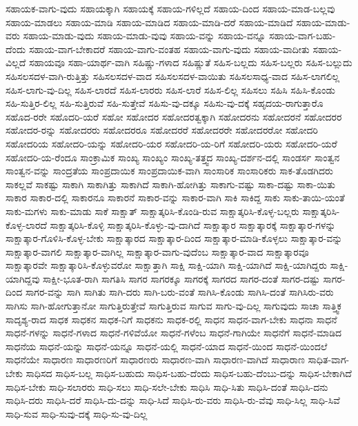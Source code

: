 {ಸಹಾಯಕ-ವಾಗು-ವುದು
ಸಹಾಯಕ್ಕಾಗಿ
ಸಹಾಯಕ್ಕೆ
ಸಹಾಯ-ಗಳಿಲ್ಲದೆ
ಸಹಾಯ-ದಿಂದ
ಸಹಾಯ-ಮಾಡ-ಬಲ್ಲವು
ಸಹಾಯ-ಮಾಡಲು
ಸಹಾಯ-ಮಾಡಿ
ಸಹಾಯ-ಮಾಡಿದ
ಸಹಾಯ-ಮಾಡಿ-ದರೆ
ಸಹಾಯ-ಮಾಡಿದೆ
ಸಹಾಯ-ಮಾಡು-ವರು
ಸಹಾಯ-ಮಾಡು-ವುದು
ಸಹಾಯ-ಮಾಡು-ವುವು
ಸಹಾಯ-ವನ್ನು
ಸಹಾಯ-ವನ್ನೂ
ಸಹಾಯ-ವಾಗ-ಬಹು-ದೆಂದು
ಸಹಾಯ-ವಾಗ-ಬೇಕಾದರೆ
ಸಹಾಯ-ವಾಗು-ವಂತಹ
ಸಹಾಯ-ವಾಗು-ವುದು
ಸಹಾಯ-ವಾದೀತು
ಸಹಾಯ-ವಿಲ್ಲದೆ
ಸಹಾಯವೂ
ಸಹಾ-ಯಾರ್ಥ-ವಾಗಿ
ಸಹಿಷ್ಣು-ಗಳಾದ
ಸಹಿಷ್ಣುತೆ
ಸಹಿಸ-ಬಲ್ಲದು
ಸಹಿಸ-ಬಲ್ಲರು
ಸಹಿಸ-ಬಲ್ಲುದು
ಸಹಿಸಲಸದಳ-ವಾಗಿ-ರುತ್ತಿತ್ತು
ಸಹಿಸಲಸದಳ-ವಾದ
ಸಹಿಸಲಸದಳ-ವಾಯಿತು
ಸಹಿಸಲಸಾಧ್ಯ-ವಾದ
ಸಹಿಸ-ಲಾಗಲಿಲ್ಲ
ಸಹಿಸ-ಲಾಗು-ವು-ದಿಲ್ಲ
ಸಹಿಸ-ಲಾರದೆ
ಸಹಿಸ-ಲಾರರು
ಸಹಿಸ-ಲಾರೆ
ಸಹಿಸ-ಲಿಲ್ಲ
ಸಹಿಸಲು
ಸಹಿಸಿ
ಸಹಿಸಿ-ಕೊಂಡು
ಸಹಿ-ಸುತ್ತಿರ-ಲಿಲ್ಲ
ಸಹಿ-ಸುತ್ತಿರುವೆ
ಸಹಿ-ಸುತ್ತೇವೆ
ಸಹಿಸು-ವು-ದಕ್ಕೂ
ಸಹಿಸು-ವು-ದಕ್ಕೆ
ಸಹೃದಯ-ರಾಗುತ್ತಾರೊ
ಸಹೊದ-ರರೇ
ಸಹೊದರಿ-ಯರೆ
ಸಹೋ
ಸಹೋದರ
ಸಹೋದರತ್ವಕ್ಕಾಗಿ
ಸಹೋದರನು
ಸಹೋದರನೆ
ಸಹೋದರರ
ಸಹೋದರ-ರನ್ನು
ಸಹೋದರರು
ಸಹೋದರರೂ
ಸಹೋದರರೆ
ಸಹೋದರರೇ
ಸಹೋದರರೋ
ಸಹೋದರಿ
ಸಹೋದರಿಯ
ಸಹೋದರಿ-ಯನ್ನು
ಸಹೋದರಿ-ಯರ
ಸಹೋದರಿ-ಯ-ರಿಗೆ
ಸಹೋದರಿ-ಯರು
ಸಹೋದರಿ-ಯರೆ
ಸಹೋದರಿ-ಯ-ರೆಂದೂ
ಸಾಂಕ್ರಾಮಿಕ
ಸಾಂಖ್ಯ
ಸಾಂಖ್ಯಂ
ಸಾಂಖ್ಯ-ತತ್ತ್ವದ
ಸಾಂಖ್ಯ-ದರ್ಶನ-ದಲ್ಲಿ
ಸಾಂಡರ್ಸ
ಸಾಂತ್ವನ
ಸಾಂತ್ವನ-ವನ್ನು
ಸಾಂದ್ರತೆಯ
ಸಾಂಪ್ರದಾಯಿಕ
ಸಾಂಪ್ರದಾಯಿಕ-ವಾಗಿ
ಸಾಂಸಾರಿಕ
ಸಾಂಸಾರಿಕರು
ಸಾಕ-ತೊಡಗಿದರು
ಸಾಕಲ್ಲವೆ
ಸಾಕಷ್ಟು
ಸಾಕಾಗಿ
ಸಾಕಾಗಿತ್ತು
ಸಾಕಾಗಿದೆ
ಸಾಕಾಗಿ-ಹೋಗಿತ್ತು
ಸಾಕಾಗು-ವಷ್ಟು
ಸಾಕಾ-ದಷ್ಟು
ಸಾಕಾ-ಯಿತು
ಸಾಕಾರ
ಸಾಕಾರ-ದಲ್ಲಿ
ಸಾಕಾರನೂ
ಸಾಕಾರನೆ
ಸಾಕಾರ-ವನ್ನು
ಸಾಕಾರ-ವಾಗಿ
ಸಾಕಿ
ಸಾಕಿದ್ದ
ಸಾಕು
ಸಾಕು-ತಾಯಿ-ಯಂತೆ
ಸಾಕು-ಮಗಳು
ಸಾಕು-ಮಾಡು
ಸಾಕೆ
ಸಾಕ್ಷಾತ್
ಸಾಕ್ಷಾತ್ಕರಿಸಿ-ಕೊಂಡಿ-ರುವ
ಸಾಕ್ಷಾತ್ಕರಿಸಿ-ಕೊಳ್ಳ-ಬಲ್ಲರು
ಸಾಕ್ಷಾತ್ಕರಿಸಿ-ಕೊಳ್ಳ-ಲಾರದೆ
ಸಾಕ್ಷಾತ್ಕರಿಸಿ-ಕೊಳ್ಳಿ
ಸಾಕ್ಷಾತ್ಕರಿಸಿ-ಕೊಳ್ಳು-ವು-ದಾಗಿದೆ
ಸಾಕ್ಷಾತ್ಕಾರ
ಸಾಕ್ಷಾತ್ಕಾರಕ್ಕೆ
ಸಾಕ್ಷಾತ್ಕಾರ-ಗಳನ್ನು
ಸಾಕ್ಷಾತ್ಕಾರ-ಗೊಳಿಸಿ-ಕೊಳ್ಳ-ಬೇಕು
ಸಾಕ್ಷಾತ್ಕಾರದ
ಸಾಕ್ಷಾತ್ಕಾರ-ದಿಂದ
ಸಾಕ್ಷಾತ್ಕಾರ-ಮಾಡಿ-ಕೊಳ್ಳಲು
ಸಾಕ್ಷಾತ್ಕಾರ-ವನ್ನು
ಸಾಕ್ಷಾತ್ಕಾರ-ವಾಗಲಿ
ಸಾಕ್ಷಾತ್ಕಾರ-ವಾಗಿಲ್ಲ
ಸಾಕ್ಷಾತ್ಕಾರ-ವಾಗು-ವುದೆಂಬ
ಸಾಕ್ಷಾತ್ಕಾರ-ವಾದ
ಸಾಕ್ಷಾತ್ಕಾರವೂ
ಸಾಕ್ಷಾತ್ಕಾರವೇ
ಸಾಕ್ಷಾತ್ಕಾರಿಸಿ-ಕೊಳ್ಳುವರೋ
ಸಾಕ್ಷಾತ್ತಾಗಿ
ಸಾಕ್ಷಿ
ಸಾಕ್ಷಿ-ಯಾಗಿ
ಸಾಕ್ಷಿ-ಯಾಗಿದೆ
ಸಾಕ್ಷಿ-ಯಾಗಿದ್ದರು
ಸಾಕ್ಷಿ-ಯಾಗಿದ್ದವು
ಸಾಕ್ಷೀ-ಭೂತ-ರಾಗಿ
ಸಾಗತಿಸಿ
ಸಾಗರ
ಸಾಗರಕ್ಕೂ
ಸಾಗರಕ್ಕೆ
ಸಾಗರದ
ಸಾಗರ-ದಂತೆ
ಸಾಗರ-ದಷ್ಟು
ಸಾಗರ-ದಿಂದ
ಸಾಗರ-ವನ್ನು
ಸಾಗಿ
ಸಾಗಿತು
ಸಾಗಿ-ದರು
ಸಾಗಿ-ಬರು-ವಂತೆ
ಸಾಗಿಸಿ-ಕೊಂಡು
ಸಾಗಿಸಿ-ದಂತೆ
ಸಾಗಿಸಿರು-ವರು
ಸಾಗಿಸು
ಸಾಗಿ-ಹೋಗುತ್ತಾನೋ
ಸಾಗುತ್ತಿರುತ್ತೇವೆ
ಸಾಗುತ್ತಿರುವ
ಸಾಗುವ
ಸಾಗು-ವು-ದಿಲ್ಲ
ಸಾಗುವುದು
ಸಾಚಾ
ಸಾತ್ತ್ವಿಕ
ಸಾದೃಶ್ಯ-ರಾದ
ಸಾಧಕ
ಸಾಧಕನ
ಸಾಧಕ-ನಿಗೆ
ಸಾಧಕನು
ಸಾಧಕ-ರಲ್ಲಿ
ಸಾಧನ
ಸಾಧನ-ವಾಗ-ಬೇಕು
ಸಾಧನಾ
ಸಾಧನೆ
ಸಾಧನೆ-ಗಳನ್ನು
ಸಾಧನೆ-ಗಳಾದ
ಸಾಧನೆ-ಗಳಿವೆಯೋ
ಸಾಧನೆ-ಗಳೆಂಬ
ಸಾಧನೆ-ಗಾಗಿಯೇ
ಸಾಧನೆಗೆ
ಸಾಧನೆ-ಮಾಡಿದ
ಸಾಧನೆಯ
ಸಾಧನೆ-ಯನ್ನು
ಸಾಧನೆ-ಯನ್ನೂ
ಸಾಧನೆ-ಯಲ್ಲಿ
ಸಾಧನೆ-ಯಾದ
ಸಾಧನೆ-ಯಿಂದ
ಸಾಧನೆ-ಯಿಂದಲೆ
ಸಾಧನೆಯೇ
ಸಾಧಾರಣ
ಸಾಧಾರಣರಿಗೆ
ಸಾಧಾರಣರು
ಸಾಧಾರಣ-ವಾಗಿ
ಸಾಧಾರಣ-ವಾಗಿದೆ
ಸಾಧಾರಾಣ
ಸಾಧಿತ-ವಾಗ-ಬೇಕು
ಸಾಧಿಸದ
ಸಾಧಿಸ-ಬಲ್ಲ
ಸಾಧಿಸ-ಬಹುದು
ಸಾಧಿಸ-ಬಹು-ದೆಂದು
ಸಾಧಿಸ-ಬಹು-ದೆಂಬು-ದನ್ನು
ಸಾಧಿಸ-ಬೇಕಾಗಿದೆ
ಸಾಧಿಸ-ಬೇಕು
ಸಾಧಿ-ಸಲಾರರು
ಸಾಧಿ-ಸಲು
ಸಾಧಿ-ಸಲೇ-ಬೇಕು
ಸಾಧಿಸಿ
ಸಾಧಿ-ಸಿತು
ಸಾಧಿಸಿ-ದಂತೆ
ಸಾಧಿಸಿ-ದನು
ಸಾಧಿಸಿ-ದರು
ಸಾಧಿಸಿ-ದರೆ
ಸಾಧಿಸಿ-ದು-ದನ್ನು
ಸಾಧಿ-ಸಿದೆ
ಸಾಧಿಸಿ-ರು-ವರು
ಸಾಧಿಸಿ-ರು-ವೆವು
ಸಾಧಿ-ಸಿಲ್ಲ
ಸಾಧಿ-ಸಿವೆ
ಸಾಧಿ-ಸುವ
ಸಾಧಿ-ಸುವು-ದಕ್ಕೆ
ಸಾಧಿ-ಸು-ವು-ದಿಲ್ಲ
}
